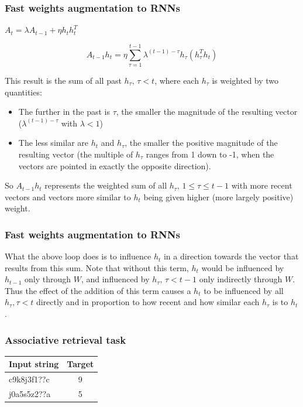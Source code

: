 \documentclass{beamer}
\begin{document}
\begin{frame}
  \frametitle{Fast weights augmentation to RNNs}
    $A_t = \lambda A_{t-1} + \eta h_t h_t^T$

    \begin{equation*}
A_{t-1} h_t = \eta \sum_{\tau=1}^{t-1} \lambda^{(t-1) - \tau} h_\tau \left(h_\tau^T h_t\right)
    \end{equation*}

This result is the sum of all past $h_\tau,\, \tau < t$, where each $h_\tau$ is weighted by two quantities:

\begin{itemize}
\item The further in the past is $\tau$, the smaller the magnitude of the resulting vector ($\lambda^{(t-1) - \tau}$ with $\lambda < 1$)
\item The less similar are $h_t$ and $h_\tau$, the smaller the positive magnitude of the resulting vector (the multiple of $h_\tau$ ranges from 1 down to -1, when the vectors are pointed in exactly the opposite direction).
\end{itemize}
%
So $A_{t-1} h_t$ represents the weighted sum of all $h_\tau,\, 1 \leq \tau \leq t-1$ with more recent vectors and vectors more similar to $h_t$ being given higher (more largely positive) weight.
\end{frame}

\begin{frame}
  \frametitle{Fast weights augmentation to RNNs}
  What the above loop does is to influence $h_t$ in a direction towards the vector that results from this sum. Note that without this term, $h_t$ would be influenced by $h_{t-1}$ only through $W$, and influenced by $h_\tau,\, \tau < t-1$ only indirectly through $W$. Thus the effect of the addition of this term causes a $h_t$ to be influenced by all $h_\tau, \tau < t$ directly and in proportion to how recent and how similar each $h_\tau$ is to $h_t$.
\end{frame}

\begin{frame}
  \frametitle{Associative retrieval task}
  \begin{center}
    \begin{tabular}{lc}
      Input string & Target \\
      \hline
      c9k8j3f1??c & 9 \\
      j0a5s5z2??a & 5 \\
    \end{tabular}
  \end{center}
\end{frame}
\end{document}
